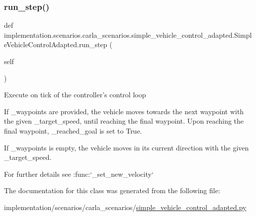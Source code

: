 \subsubsection{\texorpdfstring{run\+\_\+step()}{run\_step()}}
{\footnotesize\ttfamily def implementation.\+scenarios.\+carla\+\_\+scenarios.\+simple\+\_\+vehicle\+\_\+control\+\_\+adapted.\+Simple\+Vehicle\+Control\+Adapted.\+run\+\_\+step (\begin{DoxyParamCaption}\item[{}]{self }\end{DoxyParamCaption})}

\begin{DoxyVerb}Execute on tick of the controller's control loop

If _waypoints are provided, the vehicle moves towards the next waypoint
with the given _target_speed, until reaching the final waypoint. Upon reaching
the final waypoint, _reached_goal is set to True.

If _waypoints is empty, the vehicle moves in its current direction with
the given _target_speed.

For further details see :func:`_set_new_velocity`
\end{DoxyVerb}
 

The documentation for this class was generated from the following file\+:\begin{DoxyCompactItemize}
\item 
implementation/scenarios/carla\+\_\+scenarios/\hyperlink{simple__vehicle__control__adapted_8py}{simple\+\_\+vehicle\+\_\+control\+\_\+adapted.\+py}\end{DoxyCompactItemize}

